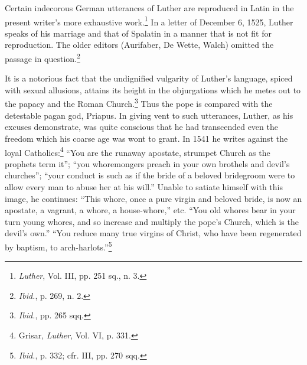 Certain indecorous German utterances of Luther are reproduced in Latin
in the present writer’s more exhaustive work.\footnote{\textit{Luther}, Vol. III, pp. 251 sq., n. 3.}
 In a letter of December 6,
1525, Luther speaks of his marriage and that of Spalatin in a manner that
is not fit for reproduction. The older editors (Aurifaber, De Wette, Walch)
omitted the passage in question.\footnote{\textit{Ibid.}, p. 269, n. 2.}

It is a notorious fact that the undignified vulgarity of Luther’s language,
spiced with sexual allusions, attains its height in the objurgations which he
metes out to the papacy and the Roman Church.\footnote{\textit{Ibid.}, pp. 265 sqq.}
Thus the pope is compared
with the detestable pagan god, Priapus. In giving vent to such utterances,
Luther, as his excuses demonstrate, was quite conscious that he had
transcended even the freedom which his coarse age was wont to grant. In
1541 he writes against the loyal Catholics:\footnote{Grisar, \textit{Luther}, Vol. VI, p. 331.}
 “You are the runaway apostate,
strumpet Church as the prophets term it”; “you whoremongers preach
in your own brothels and devil’s churches”; “your conduct is such as if the
bride of a beloved bridegroom were to allow every man to abuse her at his
will.” Unable to satiate himself with this image, he continues: “This whore,
once a pure virgin and beloved bride, is now an apostate, a vagrant, a whore, a
house-whore,” etc. “You old whores bear in your turn young whores, and so
increase and multiply the pope’s Church, which is the devil’s own.” “You reduce
many true virgins of Christ, who have been regenerated by baptism,
to arch-harlots.”\footnote{\textit{Ibid.}, p. 332; cfr. III, pp. 270 sqq.}
